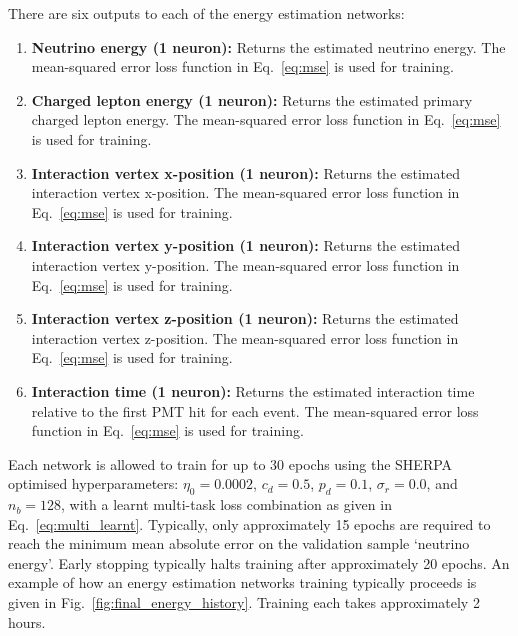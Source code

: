 There are six outputs to each of the energy estimation networks:
\begin{enumerate}
    \item \textbf{Neutrino energy (1 neuron):} Returns the estimated neutrino energy. The
          mean-squared error loss function in Eq.~\ref{eq:mse} is used for training.
    \item \textbf{Charged lepton energy (1 neuron):} Returns the estimated primary charged lepton
          energy. The mean-squared error loss function in Eq.~\ref{eq:mse} is used for training.
    \item \textbf{Interaction vertex x-position (1 neuron):} Returns the estimated interaction
          vertex x-position. The mean-squared error loss function in Eq.~\ref{eq:mse} is used for
          training.
    \item \textbf{Interaction vertex y-position (1 neuron):} Returns the estimated interaction
          vertex y-position. The mean-squared error loss function in Eq.~\ref{eq:mse} is used for
          training.
    \item \textbf{Interaction vertex z-position (1 neuron):} Returns the estimated interaction
          vertex z-position. The mean-squared error loss function in Eq.~\ref{eq:mse} is used for
          training.
    \item \textbf{Interaction time (1 neuron):} Returns the estimated interaction time relative to
          the first PMT hit for each event. The mean-squared error loss function in
          Eq.~\ref{eq:mse} is used for training.
\end{enumerate}

Each network is allowed to train for up to 30 epochs using the SHERPA optimised hyperparameters:
$\eta_{0}=0.0002$, $c_{d}=0.5$, $p_{d}=0.1$, $\sigma_{r}=0.0$, and $n_{b}=128$, with a learnt
multi-task loss combination as given in Eq.~\ref{eq:multi_learnt}. Typically, only approximately
15 epochs are required to reach the minimum mean absolute error on the validation sample `neutrino
energy'. Early stopping typically halts training after approximately 20 epochs. An example of how
an energy estimation networks training typically proceeds is given in
Fig.~\ref{fig:final_energy_history}. Training each takes approximately 2 hours.

